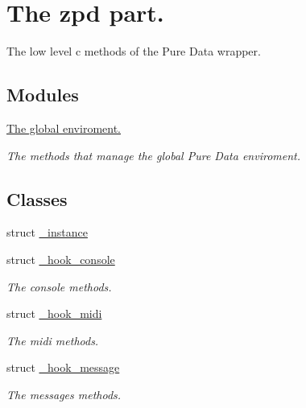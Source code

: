 \hypertarget{group__zpd}{\section{The zpd part.}
\label{group__zpd}
}


The low level c methods of the Pure Data wrapper.  


\subsection*{Modules}
\begin{DoxyCompactItemize}
\item 
\hyperlink{group__enviroment}{The global enviroment.}
\begin{DoxyCompactList}\small\item\em The methods that manage the global Pure Data enviroment. \end{DoxyCompactList}\end{DoxyCompactItemize}
\subsection*{Classes}
\begin{DoxyCompactItemize}
\item 
struct \hyperlink{struct__instance}{\-\_\-instance}
\item 
struct \hyperlink{struct__hook__console}{\-\_\-hook\-\_\-console}
\begin{DoxyCompactList}\small\item\em The console methods. \end{DoxyCompactList}\item 
struct \hyperlink{struct__hook__midi}{\-\_\-hook\-\_\-midi}
\begin{DoxyCompactList}\small\item\em The midi methods. \end{DoxyCompactList}\item 
struct \hyperlink{struct__hook__message}{\-\_\-hook\-\_\-message}
\begin{DoxyCompactList}\small\item\em The messages methods. \end{DoxyCompactList}\end{DoxyCompactItemize}
